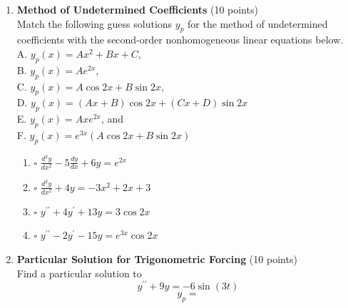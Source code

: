 \begin{enumerate}
  \item \textbf{Method of Undetermined Coefficients} (10 points)\\
  Match the following guess solutions $y_p$ for the method of undetermined coefficients with the second-order nonhomogeneous linear equations below.\\
  A. $y_p(x)=A x^2+B x+C$,\\
  B. $y_p(x)=A e^{2 x}$,\\
  C. $y_p(x)=A \cos 2 x+B \sin 2 x$,\\
  D. $y_p(x)=(A x+B) \cos 2 x+(C x+D) \sin 2 x$\\
  E. $y_p(x)=A x e^{2 x}$, and\\
  F. $y_p(x)=e^{3 x}(A \cos 2 x+B \sin 2 x)$\\
  \begin{enumerate}[label=\arabic*.]
    \item $\square$ $\frac{d^2 y}{d x^2}-5 \frac{d y}{d x}+6 y=e^{2 x}$\\
    \begin{subanswer}
    \end{subanswer}
    \item $\square$ $\frac{d^2 y}{d x^2}+4 y=-3 x^2+2 x+3$\\
    \begin{subanswer}
    \end{subanswer}
    \item $\square$ $y^{\prime \prime}+4 y^{\prime}+13 y=3 \cos 2 x$\\
    \begin{subanswer}
    \end{subanswer}
    \item $\square$ $y^{\prime \prime}-2 y^{\prime}-15 y=e^{3 x} \cos 2 x$\\
    \begin{subanswer}
    \end{subanswer}
  \end{enumerate}

  \item \textbf{Particular Solution for Trigonometric Forcing} (10 points)\\
  Find a particular solution to
  $$
  y^{\prime \prime}+9 y=-6 \sin (3 t)
  $$
  $$
  y_p=
  $$
  \begin{subanswer}
  \end{subanswer}
\end{enumerate}
